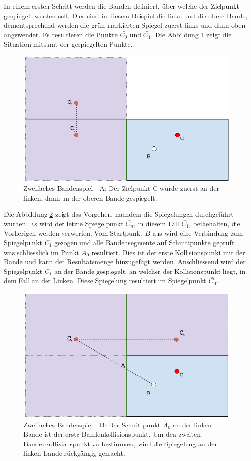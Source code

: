 \newpage
In einem ersten Schritt werden die Banden definiert, über welche der Zielpunkt gespiegelt werden soll. Dies sind in
diesem Beispiel die linke und die obere Bande, dementsprechend werden die grün markierten Spiegel zuerst links und
dann oben angewendet. Es resultieren die Punkte $\bar{C_0}$ und $\bar{C_1}$. Die Abbildung \ref{fig:zweifaches_bandenspiel_a} zeigt die
Situation mitsamt der gespiegelten Punkte.
\begin{figure}[h]
    \begin{center}
        \includegraphics[width=0.5\linewidth]{../common/03_billiard_ai/resources/50_rail_reflection_2_a.png}
    \end{center}
    \caption{Zweifaches Bandenspiel - A: Der Zielpunkt C wurde zuerst an der linken, dann an der oberen Bande gespiegelt.}
    \label{fig:zweifaches_bandenspiel_a}
\end{figure}

Die Abbildung \ref{fig:zweifaches_bandenspiel_b} zeigt das Vorgehen, nachdem die Spiegelungen durchgeführt wurden.
Es wird der letzte Spiegelpunkt $\bar{C_n}$, in diesem Fall $\bar{C_1}$,
beibehalten, die Vorherigen werden verworfen. Vom Startpunkt $B$ aus wird eine Verbindung zum Spiegelpunkt $\bar{C_1}$
gezogen und alle Bandensegmente auf Schnittpunkte geprüft, was schliesslich im Punkt $A_0$ resultiert. Dies ist
der erste Kollisionspunkt mit der Bande und kann der Resultatsmenge hinzugefügt werden. Anschliessend wird der Spiegelpunkt
$\bar{C_1}$ an der Bande gespiegelt, an welcher der Kollisionspunkt liegt, in dem Fall an der Linken. Diese Spiegelung
resultiert im Spiegelpunkt $\bar{C_0}$.
\begin{figure}[h]
    \begin{center}
        \includegraphics[width=0.5\linewidth]{../common/03_billiard_ai/resources/51_rail_reflection_2_b.png}
    \end{center}
    \caption{Zweifaches Bandenspiel - B: Der Schnittpunkt $A_0$ an der linken Bande ist der erste Bandenkollisionspunkt.
    Um den zweiten Bandenkollisionspunkt zu bestimmen, wird die Spiegelung an der linken Bande rückgängig gemacht.}
    \label{fig:zweifaches_bandenspiel_b}
\end{figure}

